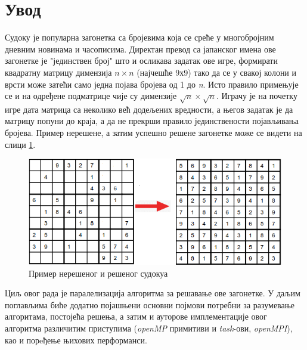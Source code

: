 \section{Увод}
Судоку је популарна загонетка са бројевима која се среће у многобројним дневним новинама  и часописима. Директан превод са јапанског имена ове загонетке је "јединствен број" што и осликава задатак ове игре, формирати квадратну матрицу димензија \(n \times n\) (најчешће 9х9) тако да се у свакој колони и врсти може затећи само једна појава бројева од 1 до \textit{n}. Исто правило примењује се и на одређене подматрице чије су димензије \(\sqrt{n} \times \sqrt{n}\). Играчу је на почетку игре дата матрица са неколико већ додељених вредности, а његов задатак је да матрицу попуни до краја, а да не прекрши правило јединствености појављивања бројева. Пример нерешене, а затим успешно решене загонетке може се видети на слици \ref{fig:unsolved_solved}.

\begin{figure}[H]
    \centering
    \includegraphics[width=1\textwidth]{images/unsolved_solved.png}
    \caption{Пример нерешеног и решеног судокуа}
    \label{fig:unsolved_solved}
\end{figure}

Циљ овог рада је паралелизација алгоритма за решавање ове загонетке. У даљим поглављима биће додатно појашњени основни појмови потребни за разумевање алгоритама, постојећа решења, а затим и ауторове имплементације овог алгоритма различитим приступима (\textit{openMP} примитиви и \textit{task}-ови, \textit{openMPI}), као и порeђење њихових перформанси.